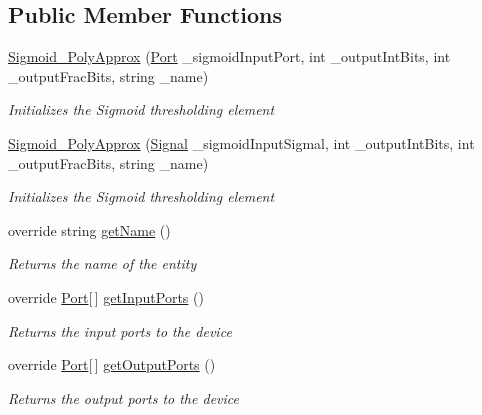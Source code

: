 \subsection*{Public Member Functions}
\begin{DoxyCompactItemize}
\item 
\hyperlink{class_n_n_gen_1_1_sigmoid___poly_approx_afcf01b0610e4b2835f237038e7f3ff40}{Sigmoid\+\_\+\+Poly\+Approx} (\hyperlink{class_n_n_gen_1_1_port}{Port} \+\_\+sigmoid\+Input\+Port, int \+\_\+output\+Int\+Bits, int \+\_\+output\+Frac\+Bits, string \+\_\+name)
\begin{DoxyCompactList}\small\item\em Initializes the Sigmoid thresholding element \end{DoxyCompactList}\item 
\hyperlink{class_n_n_gen_1_1_sigmoid___poly_approx_a911d3d616c3eceb6ff57bfe371489264}{Sigmoid\+\_\+\+Poly\+Approx} (\hyperlink{class_n_n_gen_1_1_signal}{Signal} \+\_\+sigmoid\+Input\+Sigmal, int \+\_\+output\+Int\+Bits, int \+\_\+output\+Frac\+Bits, string \+\_\+name)
\begin{DoxyCompactList}\small\item\em Initializes the Sigmoid thresholding element \end{DoxyCompactList}\item 
override string \hyperlink{class_n_n_gen_1_1_sigmoid___poly_approx_a68e8a0e324f6cae64ee7d2f841c35506}{get\+Name} ()
\begin{DoxyCompactList}\small\item\em Returns the name of the entity \end{DoxyCompactList}\item 
override \hyperlink{class_n_n_gen_1_1_port}{Port}\mbox{[}$\,$\mbox{]} \hyperlink{class_n_n_gen_1_1_sigmoid___poly_approx_ac4cf07415c0dc69efdaf91cfc561b68f}{get\+Input\+Ports} ()
\begin{DoxyCompactList}\small\item\em Returns the input ports to the device \end{DoxyCompactList}\item 
override \hyperlink{class_n_n_gen_1_1_port}{Port}\mbox{[}$\,$\mbox{]} \hyperlink{class_n_n_gen_1_1_sigmoid___poly_approx_ad4add2a8c53cc31373dab81e8ea634e2}{get\+Output\+Ports} ()
\begin{DoxyCompactList}\small\item\em Returns the output ports to the device \end{DoxyCompactList}\item 

\end{DoxyCompactItemize}
